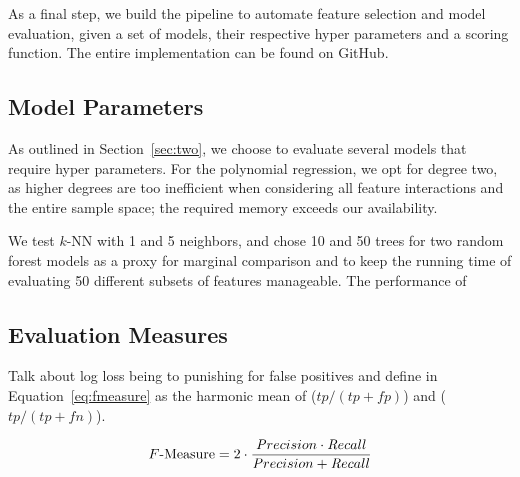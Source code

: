 As a final step, we build the pipeline to automate feature selection and model
evaluation, given a set of models, their respective hyper parameters and a
scoring function.  The entire implementation can be found on
GitHub.

\subsection{Model Parameters}

As outlined in Section~\ref{sec:two}, we choose to evaluate several models that
require hyper parameters.  For the polynomial regression, we opt for degree two,
as higher degrees are too inefficient when considering all feature interactions
and the entire sample space; the required memory exceeds our availability.

We test $k$-NN with 1 and 5 neighbors, and chose 10 and 50 trees for two random
forest models as a proxy for marginal comparison and to keep the running time of
evaluating 50 different subsets of features manageable.  The performance of 

\subsection{Evaluation Measures}

Talk about log loss being to punishing for false positives and define
\fmeasure{} in Equation~\ref{eq:fmeasure} as the harmonic mean of \precision{}
($tp / (tp + fp)$) and \recall{} ($tp / (tp + fn)$).

\begin{equation}\label{eq:fmeasure}
  \text{\ensuremath{F}-Measure} = 2 \cdot \frac{{\mathop{\mathit Precision}} \cdot {\mathop{\mathit Recall}}} {{\mathop{\mathit Precision}} +
    {\mathop{\mathit Recall}}}
\end{equation}\vspace{-5pt}

